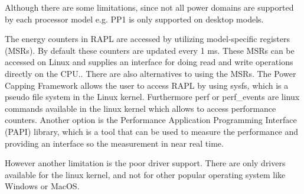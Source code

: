 

Although there are some limitations, since not all power domains are supported by each processor model e.g. PP1 is only supported on desktop models. 

The energy counters in RAPL are accessed by utilizing model-specific registers (MSRs). By default these counters are updated every 1 ms. These MSRs can be accessed on Linux and supplies an interface for doing read and write operations directly on the CPU.\cite{linux_manual_msr}. There are also alternatives to using the MSRs. The Power Capping Framework allows the user to access RAPL by using sysfs, which is a pseudo file system in the Linux kernel\cite{PowerCappingFramework,RAPL_in_action}. Furthermore perf or perf\_events are linux commands available in the linux kernel which allows to access performance counters.\cite{Perf_events,RAPL_in_action} 
Another option is the Performance Application Programming Interface (PAPI) library, which is a tool that can be used to measure the performance and providing an interface so the measurement in near real time\cite{PAPI}.\nytafsnit





However another limitation is the poor driver support. There are only drivers available for the linux kernel, and not for other popular operating system like Windows or MacOS.\cite{RAPL_in_action}  

